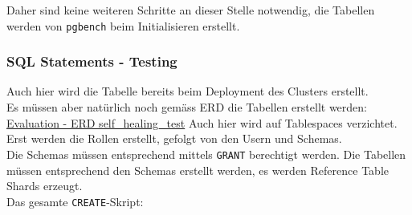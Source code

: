 Daher sind keine weiteren Schritte an dieser Stelle notwendig, die Tabellen werden von \texttt{pgbench} beim Initialisieren erstellt.
\subsubsection{SQL Statements - Testing}
\label{subsubsec:stackgres_citus_self-healing-testing_sql}
Auch hier wird die Tabelle bereits beim Deployment des Clusters erstellt.\\
Es müssen aber natürlich noch gemäss ERD die Tabellen erstellt werden:
\hyperref[subsubsec:erd_self_healing_test]{Evaluation - ERD self\_healing\_test}
Auch hier wird auf Tablespaces verzichtet.\\
Erst werden die Rollen erstellt, gefolgt von den Usern und Schemas.\\
Die Schemas müssen entsprechend mittels \texttt{GRANT} berechtigt werden.
Die Tabellen müssen entsprechend den Schemas erstellt werden, es werden Reference Table Shards erzeugt.\\
Das gesamte \texttt{CREATE}-Skript:
\lstset{style=gra_codestyle}
